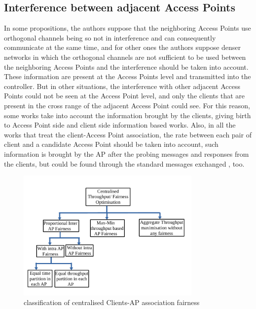 \documentclass[journal,transmag]{IEEEtran}
\begin{document}
\subsection{Interference between adjacent Access Points} 
In some propositions, the authors suppose that the neighboring Access Points use orthogonal channels being so not in interference and can consequently communicate at the same time, and for other ones the authors suppose denser networks in which the orthogonal channels are not sufficient to be used between the neighboring Access Points and the interference should be taken into account. These information are present at the Access Points level and transmitted into the controller. But in other situations, the interference with other adjacent Access Points could not be seen at the Access Point level, and only the clients that are present in the cross range of the adjacent Access Point could see. For this reason, some works take into account the information brought by the clients, giving birth to Access Point side and client side information based works. Also, in all the works that treat the client-Access Point association, the rate between each pair of client and a candidate Access Point should be taken into account, such information is brought by the AP after the probing messages and responses from the clients, but could be found through the standard messages exchanged \cite{08AP_assignement_algorithms}, too.  \\ 

\begin{figure}[t]
\centering
\includegraphics[width=9cm]{Figures/throughput_and_fairness.pdf}
\caption{classification of centralised Clients-AP association fairness}
\label{throughput_and_fairness}
\end{figure}
\end{document}
